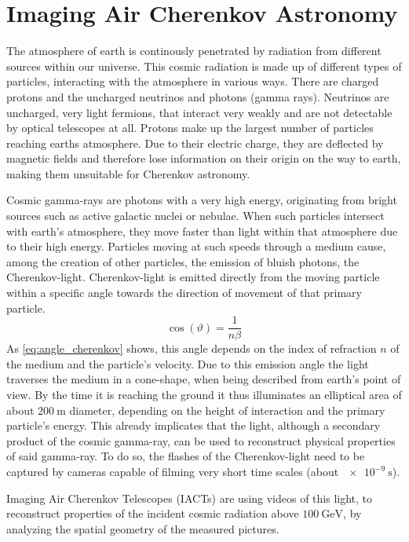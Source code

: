 \chapter{Imaging Air Cherenkov Astronomy}
\label{ch:iact}
The atmosphere of earth is continously penetrated by radiation from different
sources within our universe. This cosmic radiation is made up of different types
of particles, interacting with the atmosphere in various ways. There are
charged protons and the uncharged neutrinos and photons (gamma rays). Neutrinos
are uncharged, very light fermions, that interact very weakly and are not
detectable by optical telescopes at all. Protons make up the largest number of
particles reaching earths atmosphere. Due to their electric charge, they are
deflected by magnetic fields and therefore lose information on their origin on
the way to earth, making them unsuitable for Cherenkov astronomy.

Cosmic gamma-rays are photons with a very high energy, originating from bright
sources such as active galactic nuclei or nebulae. When such particles intersect
with earth's atmosphere, they move faster than light within that atmosphere due
to their high energy. Particles moving at such speeds through a medium cause,
among the creation of other particles, the emission of bluish photons, the
Cherenkov-light. Cherenkov-light is emitted directly from the moving particle
within a specific angle towards the direction of movement of that primary
particle.
%
\begin{equation}
    \cos(\vartheta) = \frac{1}{n\beta}
    \label{eq:angle_cherenkov}
\end{equation}
%
As \autoref{eq:angle_cherenkov} shows, this angle depends on the index of
refraction $n$ of the medium and the particle's velocity. Due to this emission
angle the light traverses the medium in a cone-shape, when being described from
earth's point of view. By the time it is reaching the ground it thus
illuminates an elliptical area of about $\SI{200}{\meter}$ diameter, depending
on the height of interaction and the primary particle's energy.
This already implicates that the light, although a secondary product of the
cosmic gamma-ray, can be used to reconstruct physical properties of
said gamma-ray. To do so, the flashes of the Cherenkov-light need to
be captured by cameras capable of filming very short time scales (about
$\SI{e-9}{\second}$).

Imaging Air Cherenkov Telescopes (IACTs) are using videos of this light, to
reconstruct properties of the incident cosmic radiation above
$\SI{100}{\giga\electronvolt}$, by analyzing the spatial geometry of the
measured pictures.

